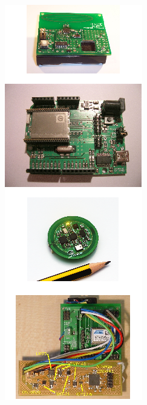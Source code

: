 \documentclass{beamer}
\begin{document}
{\begin{columns}
\includegraphics[width=\textwidth]{../hboards.png}
\end{columns}
}
\end{document}

